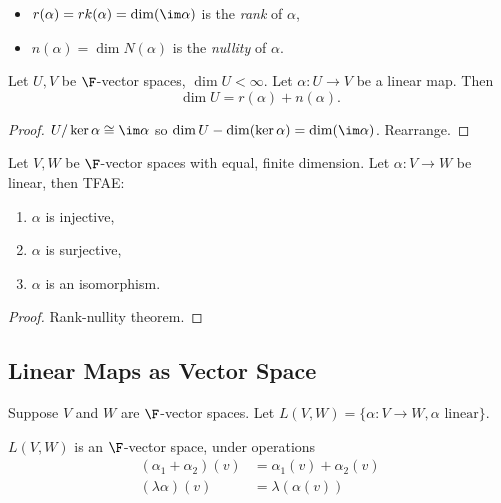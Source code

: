 \documentclass[a4paper]{article}
\theoremstyle{definition}
\begin{document}
\begin{definition}\leavevmode
  \begin{itemize}
  \item \(r(\alpha) = rk(\alpha) = \dim( \im \alpha)\) is the \emph{rank} of \(\alpha\),
  \item \(n(\alpha) = \dim N(\alpha)\) is the \emph{nullity} of \(\alpha\).
  \end{itemize}
\end{definition}

\begin{theorem}
  Let \(U, V\) be \(\F\)-vector spaces, \(\dim U < \infty\). Let \(\alpha:U\to V\) be a linear map. Then
  \[
\dim U = r(\alpha) + n(\alpha).
  \]
\end{theorem}

\begin{proof}
  \(U/\ker \alpha \cong \im \alpha\) so \(\dim U - \dim (\ker \alpha) = \dim (\im \alpha)\). Rearrange.
\end{proof}

\begin{lemma}
  Let \(V, W\) be \(\F\)-vector spaces with equal, finite dimension. Let \(\alpha:V\to W\) be linear, then TFAE:
  \begin{enumerate}
  \item \(\alpha\) is injective,
  \item \(\alpha\) is surjective,
  \item \(\alpha\) is an isomorphism.
  \end{enumerate}
\end{lemma}

\begin{proof}
  Rank-nullity theorem.
\end{proof}

\subsection{Linear Maps as Vector Space}

Suppose \(V\) and \(W\) are \(\F\)-vector spaces. Let \(L(V,W) = \{\alpha:V\to W, \alpha \text{ linear}\}\).

\begin{proposition}
  \(L(V,W)\) is an \(\F\)-vector space, under operations
  \begin{align*}
    (\alpha_1+\alpha_2)(v) &= \alpha_1(v) + \alpha_2(v) \\
    (\lambda\alpha)(v) &= \lambda(\alpha(v))
  \end{align*}
\end{proposition}
\end{document}
